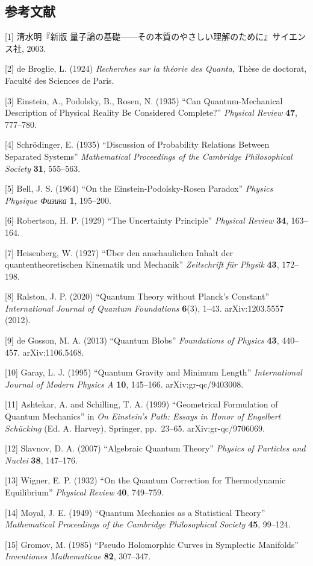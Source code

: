 \documentclass[
  11pt,
]{ltjsarticle}
\begin{document}
\subsection{参考文献}\label{ux53c2ux8003ux6587ux732e}

{[}1{]} 清水明『新版
量子論の基礎------その本質のやさしい理解のために』サイエンス社, 2003.

{[}2{]} de Broglie, L. (1924) \emph{Recherches sur la théorie des
Quanta}, Thèse de doctorat, Faculté des Sciences de Paris.

{[}3{]} Einstein, A., Podolsky, B., Rosen, N. (1935) ``Can
Quantum-Mechanical Description of Physical Reality Be Considered
Complete?'' \emph{Physical Review} \textbf{47}, 777--780.

{[}4{]} Schrödinger, E. (1935) ``Discussion of Probability Relations
Between Separated Systems'' \emph{Mathematical Proceedings of the
Cambridge Philosophical Society} \textbf{31}, 555--563.

{[}5{]} Bell, J. S. (1964) ``On the Einstein-Podolsky-Rosen Paradox''
\emph{Physics Physique Физика} \textbf{1}, 195--200.

{[}6{]} Robertson, H. P. (1929) ``The Uncertainty Principle''
\emph{Physical Review} \textbf{34}, 163--164.

{[}7{]} Heisenberg, W. (1927) ``Über den anschaulichen Inhalt der
quantentheoretischen Kinematik und Mechanik'' \emph{Zeitschrift für
Physik} \textbf{43}, 172--198.

{[}8{]} Ralston, J. P. (2020) ``Quantum Theory without Planck's
Constant'' \emph{International Journal of Quantum Foundations}
\textbf{6}(3), 1--43. arXiv:1203.5557 (2012).

{[}9{]} de Gosson, M. A. (2013) ``Quantum Blobs'' \emph{Foundations of
Physics} \textbf{43}, 440--457. arXiv:1106.5468.

{[}10{]} Garay, L. J. (1995) ``Quantum Gravity and Minimum Length''
\emph{International Journal of Modern Physics A} \textbf{10}, 145--166.
arXiv:gr-qc/9403008.

{[}11{]} Ashtekar, A. and Schilling, T. A. (1999) ``Geometrical
Formulation of Quantum Mechanics'' in \emph{On Einstein's Path: Essays
in Honor of Engelbert Schücking} (Ed. A. Harvey), Springer, pp.~23--65.
arXiv:gr-qc/9706069.

{[}12{]} Slavnov, D. A. (2007) ``Algebraic Quantum Theory''
\emph{Physics of Particles and Nuclei} \textbf{38}, 147--176.

{[}13{]} Wigner, E. P. (1932) ``On the Quantum Correction for
Thermodynamic Equilibrium'' \emph{Physical Review} \textbf{40},
749--759.

{[}14{]} Moyal, J. E. (1949) ``Quantum Mechanics as a Statistical
Theory'' \emph{Mathematical Proceedings of the Cambridge Philosophical
Society} \textbf{45}, 99--124.

{[}15{]} Gromov, M. (1985) ``Pseudo Holomorphic Curves in Symplectic
Manifolds'' \emph{Inventiones Mathematicae} \textbf{82}, 307--347.
\end{document}
